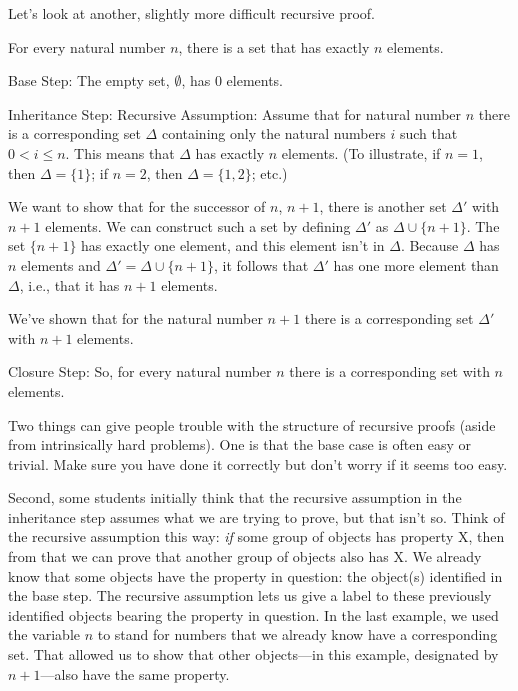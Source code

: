 \noindent{}Let's look at another, slightly more difficult recursive proof.

\begin{majorILnc}{} 
	For every natural number $n$, there is a set that has exactly $n$ elements. 
	\begin{PROOF}\begin{cenumerate}
			\item Base Step: The empty set, $\emptyset$, has $0$ elements.
			\item Inheritance Step: Recursive Assumption: Assume that for natural number $n$ there is a corresponding set $\Delta$ containing only the natural numbers $i$ such that $0<i \leq n$.  This means that $\Delta$ has exactly $n$ elements. (To illustrate, if $n=1$, then $\Delta=\{1\}$; if $n=2$, then $\Delta=\{1,2\}$; etc.)
			
			We want to show that for the successor of $n$, $n+1$, there is another set $\Delta'$ with $n+1$ elements.  We can construct such a set by defining $\Delta'$ as $\Delta\cup\{n+1\}$.  The set $\{n+1\}$ has exactly one element, and this element isn't in $\Delta$.  Because $\Delta$ has $n$ elements and $\Delta'=\Delta\cup\{n+1\}$, it follows that $\Delta'$ has one more element than $\Delta$, i.e., that it has $n+1$ elements.
			
			We've shown that for the natural number $n+1$ there is a corresponding set $\Delta'$ with $n+1$ elements.
			\item Closure Step: So, for every natural number $n$ there is a corresponding set with $n$ elements.
	\end{cenumerate}\end{PROOF}
\end{majorILnc}


\noindent{}Two things can give people trouble with the structure of recursive proofs (aside from intrinsically hard problems).  
One is that the base case is often easy or trivial. 
Make sure you have done it correctly but don't worry if it seems too easy. 

Second, some students initially think that the recursive assumption in the inheritance step assumes what we are trying to prove, but that isn't so.  Think of the recursive assumption this way: \emph{if} some group of objects has property X, then from that we can prove that another group of objects also has X.  We already know that some objects have the property in question: the object(s) identified in the base step.  The recursive assumption lets us give a label to these previously identified objects bearing the property in question. In the last example, we used the variable $n$ to stand for numbers that we already know have a corresponding set.  That allowed us to show that other objects---in this example, designated by $n+1$---also have the same property.



